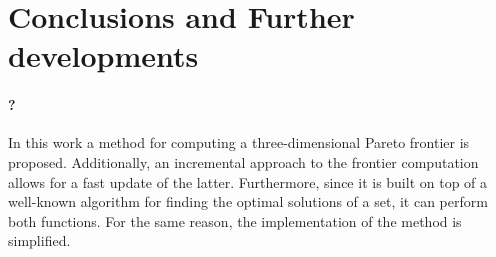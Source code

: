 \section{Conclusions and Further developments}

\paragraph{?} In this work a method for computing a three-dimensional Pareto frontier is proposed. Additionally, an incremental approach to the frontier computation allows for a fast update of the latter. Furthermore, since it is built on top of a well-known algorithm for finding the optimal solutions of a set, it can perform both functions. For the same reason, the implementation of the method is simplified.

\ \ 
